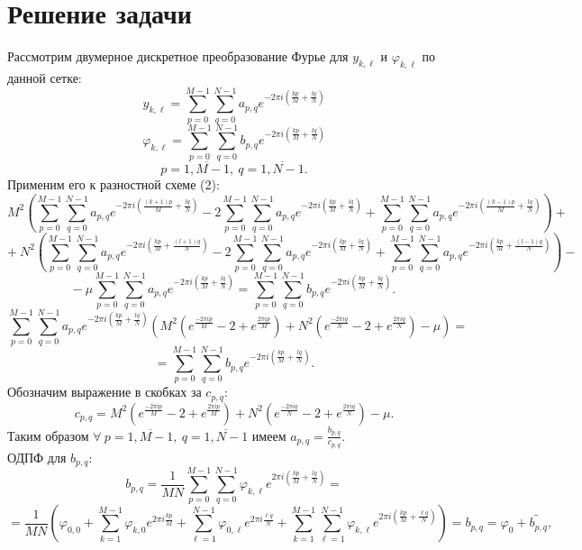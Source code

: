 \documentclass[11pt]{article}
\begin{document}
\newpage
\section{Решение задачи}

Рассмотрим двумерное дискретное преобразование Фурье для $y_{k, \ell}$ и $\varphi_{k, \ell}$ по данной сетке:
\[
y_{k,\ell} = \sum_{p=0}^{M-1} \sum_{q=0}^{N-1} a_{p,q} e^{-2\pi i \left( \frac{kp}{M} + \frac{lq}{N} \right)}
\]
\[
\varphi_{k,\ell} =  \sum_{p=0}^{M-1} \sum_{q=0}^{N-1} b_{p,q} e^{-2\pi i \left( \frac{kp}{M} + \frac{lq}{N} \right)}
\]
\[p = \overline{1, M-1},\ q = \overline{1, N-1}.\]
Применим его к разностной схеме (2):
\[
M^2\left(\sum_{p=0}^{M-1} \sum_{q=0}^{N-1} a_{p,q} e^{-2\pi i \left( \frac{(k+1)p}{M} + \frac{lq}{N} \right) } -2 \sum_{p=0}^{M-1} \sum_{q=0}^{N-1} a_{p,q} e^{-2\pi i \left( \frac{kp}{M} + \frac{lq}{N} \right)} + \sum_{p=0}^{M-1} \sum_{q=0}^{N-1} a_{p,q} e^{-2\pi i \left( \frac{(k-1)p}{M} + \frac{lq}{N} \right)}\right) +\
\]
\[
+\ N^2\left( \sum_{p=0}^{M-1} \sum_{q=0}^{N-1} a_{p,q} e^{-2\pi i \left( \frac{kp}{M} + \frac{(l+1)q}{N} \right)} -2\sum_{p=0}^{M-1} \sum_{q=0}^{N-1} a_{p,q} e^{-2\pi i \left( \frac{kp}{M} + \frac{lq}{N} \right)} + \sum_{p=0}^{M-1} \sum_{q=0}^{N-1} a_{p,q} e^{-2\pi i \left( \frac{kp}{M} + \frac{(l-1)q}{N} \right)} \right) -\
\]
\[
- \ \mu \sum_{p=0}^{M-1} \sum_{q=0}^{N-1} a_{p,q} e^{-2\pi i \left( \frac{kp}{M} + \frac{lq}{N} \right)} = \sum_{p=0}^{M-1} \sum_{q=0}^{N-1} b_{p,q} e^{-2\pi i \left( \frac{kp}{M} + \frac{lq}{N} \right)}.
\]
\[
\sum_{p=0}^{M-1} \sum_{q=0}^{N-1} a_{p,q} e^{-2\pi i \left( \frac{kp}{M} + \frac{lq}{N} \right)} \left( M^2 \left( e^{\frac{-2 \pi i p}{M}} - 2 + e^{\frac{2 \pi i p}{M}} \right) + N^2 \left( e^{\frac{-2 \pi i q}{N}} - 2 + e^{\frac{2 \pi i q}{N}} \right) - \mu \right) =\
\]
\[
= \sum_{p=0}^{M-1} \sum_{q=0}^{N-1} b_{p,q} e^{-2\pi i \left( \frac{kp}{M} + \frac{lq}{N} \right)}.
\]
Обозначим выражение в скобках за $c_{p, q}$:
\[
c_{p, q} = M^2 \left( e^{\frac{-2 \pi i p}{M}} - 2 + e^{\frac{2 \pi i p}{M}} \right) + N^2 \left( e^{\frac{-2 \pi i q}{N}} - 2 + e^{\frac{2 \pi i q}{N}} \right) - \mu.
\]
Таким образом $\forall \ p = \overline{1, M-1},\ q = \overline{1, N-1}$ имеем $a_{p, q} = \frac{b_{p, q}}{c_{p, q}}$.
\\
ОДПФ для $b_{p, q}$:
\[
b_{p, q} = \frac{1}{MN} \sum_{p=0}^{M-1} \sum_{q=0}^{N-1} \varphi_{k, \ell} e^{2\pi i \left( \frac{kp}{M} + \frac{lq}{N} \right)} = 
\]
\[
= \frac{1}{MN} \left( \varphi_{0,0} + \sum_{k=1}^{M-1} \varphi_{k,0} e^{2\pi i \frac{kp}{M}} + \sum_{\ell=1}^{N-1} \varphi_{0,\ell} e^{2\pi i \frac{\ell q}{N}} + \sum_{k=1}^{M-1} \sum_{\ell=1}^{N-1} \varphi_{k,\ell} e^{2\pi i \left( \frac{kp}{M} + \frac{\ell q}{N} \right)} \right) = b_{p,q} = \varphi_0 + \tilde{b_{p,q}},
\]
\end{document}
